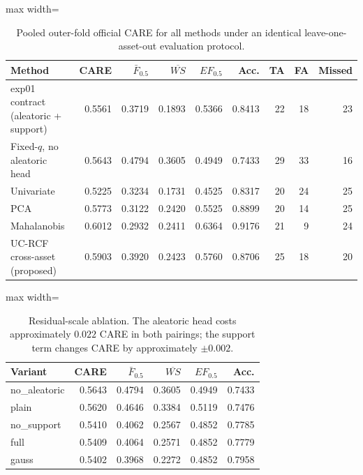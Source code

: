 \documentclass[10pt]{article}
\begin{document}

\begin{table}[htbp]
\centering
\small
\caption{Pooled outer-fold official CARE for all methods under an
identical leave-one-asset-out evaluation protocol.}
\label{tab:main}
\begin{adjustbox}{max width=\textwidth}
\begin{tabular}{lrrrrrrrr}
\toprule
Method
& CARE
& $\bar{F}_{0.5}$
& $\overline{WS}$
& $EF_{0.5}$
& Acc.
& TA
& FA
& Missed \\
\midrule
exp01 contract (aleatoric + support)
& 0.5561
& 0.3719
& 0.1893
& 0.5366
& 0.8413
& 22
& 18
& 23 \\
Fixed-$q$, no aleatoric head
& 0.5643
& 0.4794
& 0.3605
& 0.4949
& 0.7433
& 29
& 33
& 16 \\
Univariate
& 0.5225
& 0.3234
& 0.1731
& 0.4525
& 0.8317
& 20
& 24
& 25 \\
PCA
& 0.5773
& 0.3122
& 0.2420
& 0.5525
& 0.8899
& 20
& 14
& 25 \\
Mahalanobis
& 0.6012
& 0.2932
& 0.2411
& 0.6364
& 0.9176
& 21
& 9
& 24 \\
\midrule
UC-RCF cross-asset (proposed)
& 0.5903
& 0.3920
& 0.2423
& 0.5760
& 0.8706
& 25
& 18
& 20 \\
\bottomrule
\end{tabular}
\end{adjustbox}
\end{table}



\begin{table}[htbp]
\centering
\small
\caption{Residual-scale ablation. The aleatoric head costs
approximately $0.022$ CARE in both pairings; the support term changes
CARE by approximately $\pm 0.002$.}
\label{tab:ablation}
\begin{adjustbox}{max width=\textwidth}
\begin{tabular}{lrrrrr}
\toprule
Variant
& CARE
& $\bar{F}_{0.5}$
& $\overline{WS}$
& $EF_{0.5}$
& Acc. \\
\midrule
no\_aleatoric
& 0.5643
& 0.4794
& 0.3605
& 0.4949
& 0.7433 \\
plain
& 0.5620
& 0.4646
& 0.3384
& 0.5119
& 0.7476 \\
no\_support
& 0.5410
& 0.4062
& 0.2567
& 0.4852
& 0.7785 \\
full
& 0.5409
& 0.4064
& 0.2571
& 0.4852
& 0.7779 \\
gauss
& 0.5402
& 0.3968
& 0.2272
& 0.4852
& 0.7958 \\
\bottomrule
\end{tabular}
\end{adjustbox}
\end{table}
\end{document}
